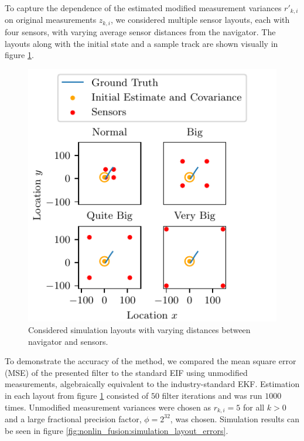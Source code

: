 To capture the dependence of the estimated modified measurement variances $r'_{k, i}$ on original measurements $z_{k, i}$, we considered multiple sensor layouts, each with four sensors, with varying average sensor distances from the navigator. The layouts along with the initial state and a sample track are shown visually in figure \ref{fig:nonlin_fusion:simulation_layouts}.
\begin{figure}[htbp]
    \centering
    \includegraphics{figures/layouts.pdf}
    \caption{Considered simulation layouts with varying distances between navigator and sensors.}
    \label{fig:nonlin_fusion:simulation_layouts}
\end{figure}
To demonstrate the accuracy of the method, we compared the mean square error (MSE) of the presented filter to the standard EIF using unmodified measurements, algebraically equivalent to the industry-standard EKF. Estimation in each layout from figure \ref{fig:nonlin_fusion:simulation_layouts} consisted of $50$ filter iterations and was run $1000$ times. Unmodified measurement variances were chosen as $r_{k, i}=5$ for all $k>0$ and a large fractional precision factor, $\phi=2^{32}$, was chosen. Simulation results can be seen in figure \ref{fig:nonlin_fusion:simulation_layout_errors}.
